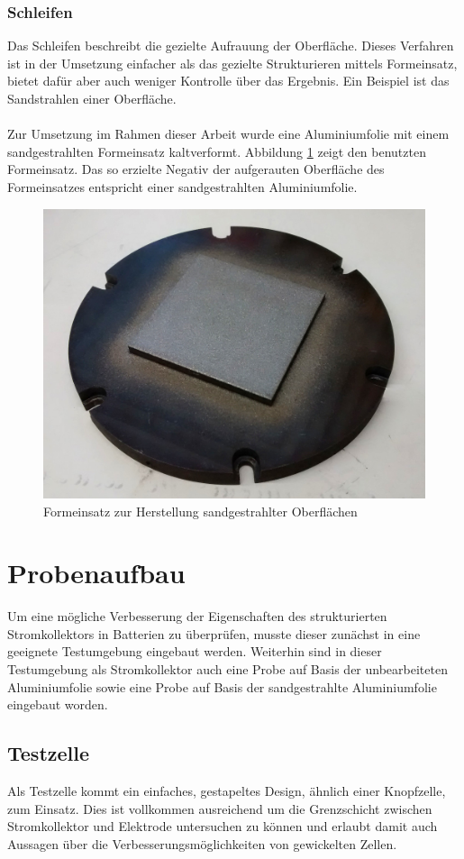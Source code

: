\documentclass[a4paper, 11pt, headsepline,footsepline,twoside,abstract]{scrbook}
\begin{document}
\subsection{Schleifen}
Das Schleifen beschreibt die gezielte Aufrauung der Oberfläche. Dieses Verfahren ist in der Umsetzung einfacher als das gezielte Strukturieren mittels Formeinsatz, bietet dafür aber auch weniger Kontrolle über das Ergebnis. Ein Beispiel ist das Sandstrahlen einer Oberfläche. \\\\
Zur Umsetzung im Rahmen dieser Arbeit wurde eine Aluminiumfolie mit einem sandgestrahlten Formeinsatz kaltverformt. Abbildung \ref{Formeinsatz_Sand} zeigt den benutzten Formeinsatz. 
Das so erzielte Negativ der aufgerauten Oberfläche des Formeinsatzes entspricht einer sandgestrahlten Aluminiumfolie.\\
\begin{figure}[h]
	\centering
	\includegraphics[width=0.85\columnwidth]{images/Formeinsatz_Sand.jpg}
	\caption{Formeinsatz zur Herstellung sandgestrahlter Oberflächen}
	\label{Formeinsatz_Sand}
\end{figure}
\chapter{Probenaufbau}
Um eine mögliche Verbesserung der Eigenschaften des strukturierten Stromkollektors in Batterien zu überprüfen, musste dieser zunächst in eine geeignete Testumgebung eingebaut werden. Weiterhin sind in dieser Testumgebung als Stromkollektor auch eine Probe auf Basis der unbearbeiteten Aluminiumfolie sowie eine Probe auf Basis der sandgestrahlte Aluminiumfolie eingebaut worden.
\section{Testzelle}
Als Testzelle kommt ein einfaches, gestapeltes Design, ähnlich einer Knopfzelle, zum Einsatz. Dies ist vollkommen ausreichend um die Grenzschicht zwischen Stromkollektor und Elektrode untersuchen zu können und erlaubt damit auch Aussagen über die Verbesserungsmöglichkeiten von gewickelten Zellen.
\end{document}
